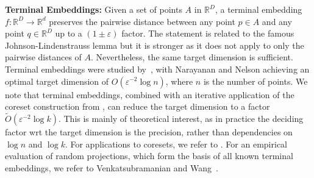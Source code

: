 {\bf Terminal Embeddings:} Given a set of points $A$ in $\mathbb{R}^D$, a terminal embedding $f:\mathbb{R}^D\rightarrow \mathbb{R}^d$ preserves the pairwise distance between any point $p\in A$ and any point $q\in \mathbb{R}^D$ up to a $(1\pm \varepsilon)$ factor. The statement is related to the famous Johnson-Lindenstrauss lemma but it is stronger as it does not apply to only the pairwise distances of $A$. Nevertheless, the same target dimension is sufficient. Terminal embeddings were studied by~\cite{CherapanamjeriN21,ElkinFN17,MahabadiMMR18,NaN18}, with Narayanan and Nelson \cite{NaN18} achieving an optimal target dimension of $O(\varepsilon^{-2}\log n)$, where $n$ is the number of points. We note that terminal embeddings, combined with an iterative application of the coreset construction from \cite{BravermanJKW21}, can reduce the target dimension to a factor $\tilde{O}(\varepsilon^{-2} \log k)$. This is mainly of theoretical interest, as in practice the deciding factor wrt the target dimension is the precision, rather than dependencies on $\log n$ and $\log k$. For applications to coresets, we refer to \cite{BecchettiBC0S19,Cohen-AddadSS21,huang2020coresets}. For an empirical evaluation of random projections, which form the basis of all known terminal embeddings, we refer to Venkatsubramanian and Wang~\cite{VenkatasubramanianW11}.


